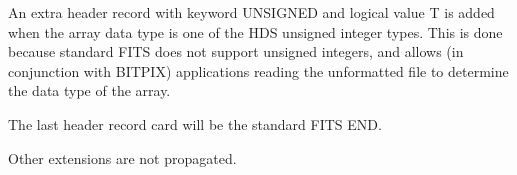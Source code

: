 {{{{            \sstitem
               An extra header record with keyword UNSIGNED and logical
               value T is added when the array data type is one of the HDS
               unsigned integer types.  This is done because standard FITS
               does not support unsigned integers, and allows (in conjunction
               with BITPIX) applications reading the unformatted file to
               determine the data type of the array.

            \sstitem
               The last header record card will be the standard FITS END.
         }

         \sstitem
            Other extensions are not propagated.
      }
   }
}
